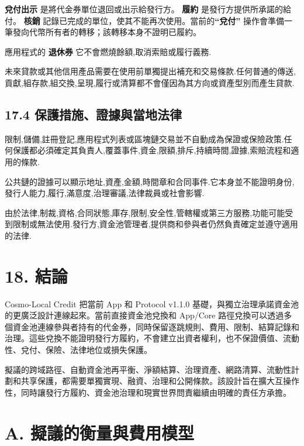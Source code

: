 \documentclass[11pt]{article}
\begin{document}
\textbf{兌付出示 } 是將代金券單位退回或出示給發行方。\textbf{ 履約 } 是發行方提供所承諾的給付。\textbf{ 核銷 } 記錄已完成的單位，使其不能再次使用。當前的\textbf{``兌付''} 操作會準備一筆發向代幣所有者的轉移；該轉移本身不證明已履約。

應用程式的 \textbf{退休券} 它不會燃燒餘額,取消索賠或履行義務.

未來貸款或其他信用產品需要在使用前單獨提出補充和交易條款.任何普通的傳送,貢獻,組存款,組交換,呈現,履行或清算都不會僅因為其方向或資產型別而產生貸款.

\subsection*{17.4 保護措施、證據與當地法律}

限制,儲備,註冊登記,應用程式列表或區塊鏈交易並不自動成為保證或保險政策.任何保護都必須確定其負責人,覆蓋事件,資金,限額,排斥,持續時間,證據,索賠流程和適用的條款.

公共鏈的證據可以顯示地址,資產,金額,時間章和合同事件.它本身並不能證明身份,發行人能力,履行,滿意度,治理審議,法律裁員或社會影響.

由於法律,制裁,資格,合同狀態,庫存,限制,安全性,管轄權或第三方服務,功能可能受到限制或無法使用.發行方,資金池管理者,提供商和參與者仍然負責確定並遵守適用的法律.


\section*{18. 結論}

Cosmo-Local Credit 把當前 App 和 Protocol v1.1.0 基礎，與獨立治理承諾資金池的更廣泛設計連線起來。當前直接資金池兌換和 App/Core 路徑兌換可以透過多個資金池連線參與者持有的代金券，同時保留逐跳規則、費用、限制、結算記錄和治理。這些兌換不能證明發行方履約，不會建立出資者權利，也不保證價值、流動性、兌付、保險、法律地位或損失保護。

擬議的跨域路徑、自動資金池再平衡、淨額結算、治理資產、網路清算、流動性計劃和共享保護，都需要單獨實現、融資、治理和公開條款。該設計旨在擴大互操作性，同時讓發行方履約、資金池治理和現實世界問責繼續由明確的責任方承擔。


\section*{A. 擬議的衡量與費用模型}
\end{document}
